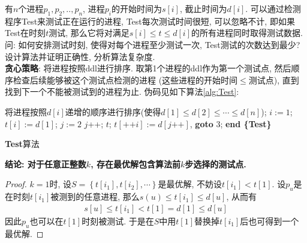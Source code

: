 \documentclass{article}
\begin{document}
\pagebreak

\begin{homeworkProblem}
	有$n$个进程$p_1,p_2,..,p_n$, 进程$p_i$的开始时间为$s[i]$, 截止时间为$d[i]$. 可以通过检测程序Test来测试正在运行的进程, Test每次测试时间很短, 可以忽略不计, 即如果Test在时刻$t$测试, 那么它将对满足$s[i]\leq t \leq d[i]$的所有进程同时取得测试数据. 问: 如何安排测试时刻, 使得对每个进程至少测试一次, Test测试的次数达到最少? 设计算法并证明正确性, 分析算法复杂度.
	\\

	\solution \textbf{贪心策略}: 将进程按照ddl进行排序. 取第1个进程的ddl作为第一个测试点, 然后顺序检查后续能够被这个测试点检测的进程 (这些进程的开始时间$\leq$测试点), 直到找到下一个不能被测试到的进程为止. 伪码见如下算法\ref{alg:Test}:
	\begin{algorithm}[H]
		\begin{algorithmic}[1]
		\State 将进程按照$d[i]$递增的顺序进行排序(使得$d[1]\leq d[2]\leq \cdots \leq d[n]$);
		\State $i:=1$; $t[i]:=d[1]$; $j:=2$ 
		 
			\State $j$++;
		\EndWhile
			\State \Return $t$;
		\Else
			\State $t[\text{++}i]:=d[j\text{++}]$, \textbf{goto} 3; 
		\EndIf
		\State \textbf{end \{Test\}}
		\end{algorithmic}
		\caption{\textbf{Test}算法}
		\label{alg:Test}
	\end{algorithm}
	\textbf{结论: 对于任意正整数$k$, 存在最优解包含算法前$k$步选择的测试点.}
	\begin{proof}
		$k=1$时, 设$S=\left\{ t\left[ i_1 \right] ,t\left[ i_2 \right] ,\cdots \right\} $是最优解, 不妨设$t\left[ i_1 \right] <t\left[ 1 \right]$. 设$p_u$是在时刻$t[i_1]$被测到的任意进程, 那么$s(u)\leq t[i_1] \leq d[u]$, 从而有
		\begin{align}
			s\left[ u \right] \le t\left[ i_1 \right] <t\left[ 1 \right] =d\left[ 1 \right] \le d\left[ u \right] 
		\end{align}
		因此$p_u$也可以在$t[1]$时刻被测试. 于是在$S$中用$t[1]$替换掉$t[i_1]$后也可得到一个最优解.


\end{proof}
\end{homeworkProblem}
\end{document}
